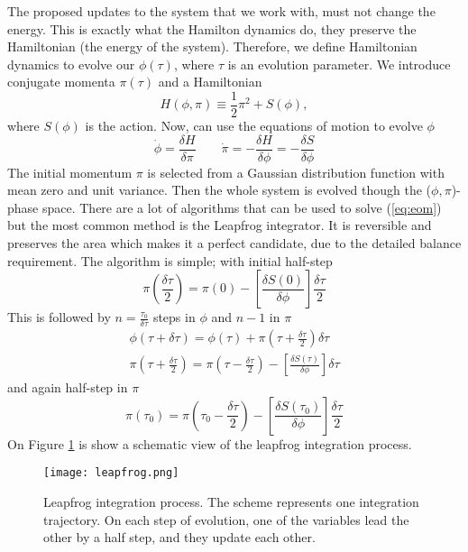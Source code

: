 The proposed updates to the system that we work with, must not change the energy. This is exactly what the Hamilton dynamics do, they preserve the Hamiltonian (the energy of the system). Therefore, we define Hamiltonian dynamics to evolve our $\phi(\tau)$, where $\tau$ is an evolution parameter. We introduce conjugate momenta $\pi(\tau)$ and a Hamiltonian 
\begin{equation}
    H(\phi,\pi) \equiv \frac{1}{2}\pi^2 + S(\phi),
\end{equation}
where $S(\phi)$ is the action. Now, can use the equations of motion to evolve $\phi$
\begin{equation}
    \dot{\phi} = \frac{\delta H}{\delta \pi} \qquad \dot{\pi} = - \frac{\delta H}{\delta \phi} = - \frac{\delta S}{\delta \phi}
    \label{eq:eom}
\end{equation}
The initial momentum $\pi$ is selected from a Gaussian distribution function with mean zero and unit variance. Then the whole system is evolved though the ($\phi,\pi$)-phase space. There are a lot of algorithms that can be used to solve (\ref{eq:eom}) but the most common method is the Leapfrog integrator. It is reversible and preserves the area which makes it a perfect candidate, due to the detailed balance requirement. The algorithm is simple; with initial half-step
\begin{equation}
    \pi\left(\frac{\delta\tau}{2}\right) = \pi\left(0\right) - \left[ \frac{\delta S(0)}{\delta\phi} \right] \frac{\delta\tau}{2}
\end{equation}
This is followed by $n=\frac{\tau_0}{\delta\tau}$ steps in $\phi$ and $n-1$ in $\pi$
\begin{equation}
    \begin{aligned}
        \phi(\tau+\delta\tau) = \phi(\tau) + \pi(\tau+\frac{\delta\tau}{2})\delta\tau
        \\
        \pi(\tau+\frac{\delta\tau}{2}) = \pi(\tau-\frac{\delta\tau}{2}) - \left[ \frac{\delta S(\tau)}{\delta\phi} \right] \delta\tau
    \end{aligned}
\end{equation}
and again half-step in $\pi$
\begin{equation}
    \pi(\tau_0) = \pi(\tau_0-\frac{\delta\tau}{2}) - \left[ \frac{\delta S(\tau_0)}{\delta\phi} \right] \frac{\delta\tau}{2}
\end{equation}
On Figure \ref{fig:leapfrog} is show a schematic view of the leapfrog integration process.
\begin{figure}[htbp]
    \centerline{\texttt{[image: leapfrog.png]}}
    \caption{Leapfrog integration process. The scheme represents one integration trajectory. On each step of evolution, one of the variables lead the other by a half step, and they update each other. %
    }
    \label{fig:leapfrog}
\end{figure}


